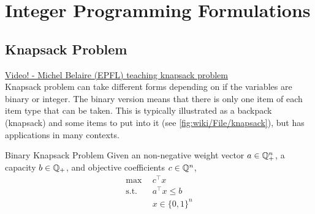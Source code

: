 \documentclass[../open-optimization/open-optimization.tex]{subfiles}
\begin{document}
\chapter{Integer Programming Formulations}
\label{sec:IP-formulations} 
\section{Knapsack Problem}
\href{https://www.youtube.com/watch?v=GteOoMGUOdY}{Video! - Michel Belaire (EPFL) teaching knapsack problem}\\

Knapsack problem can take different forms depending on if the variables are binary or integer.  The binary version means that there is only one item of each item type that can be taken.  This is typically illustrated as a backpack (knapsack) and some items to put into it (see  \autoref{fig:wiki/File/knapsack}), but has applications in many contexts.  


\begin{general}{Binary Knapsack Problem}{\npcomplete}
Given an non-negative weight vector $a \in {\mathbb{Q}}^n_+$, a capacity $b \in {\mathbb{Q}}_+$, and objective coefficients $c \in {\mathbb{Q}}^n$, 
\begin{equation}
\begin{split}
\max \ \ & c^\top x\\
\text{s.t.}\ \ & a^\top x \leq b\\
& x \in \{0,1\}^n
\end{split}
\end{equation}
\end{general}
 


 
\end{document}
